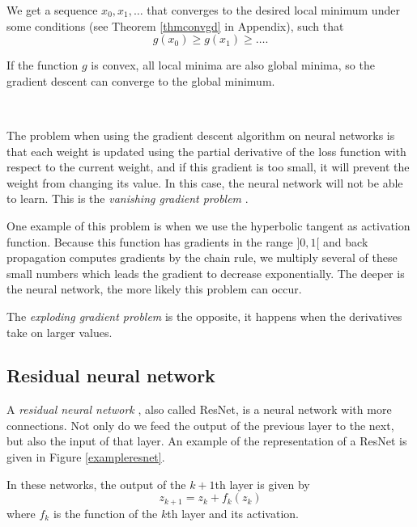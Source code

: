 \documentclass[10pt,a4paper]{article}
\theoremstyle{definition}
\theoremstyle{plain}
\begin{document}
We get a sequence $x_0,x_1,\dots$ that converges to the desired local minimum under some conditions (see Theorem \ref{thmconvgd} in Appendix), such that
$$
g(x_0) \geq g(x_1) \geq \dots . 
$$

If the function $g$ is convex, all local minima are also global minima, so the gradient descent can converge to the global minimum.

~

The problem when using the gradient descent algorithm on neural networks is that each weight is updated using the partial derivative of the loss function with respect to the current weight, and if this gradient is too small, it will prevent the weight from changing its value. In this case, the neural network will not be able to learn. This is the \textit{vanishing gradient problem} \cite{10}.

One example of this problem is when we use the hyperbolic tangent as activation function. Because this function has gradients in the range $]0,1[$ and back propagation computes gradients by the chain rule, we multiply several of these small numbers which leads the gradient to decrease exponentially. The deeper is the neural network, the more likely this problem can occur.

The \textit{exploding gradient problem} is the opposite, it happens when the derivatives take on larger values.


\subsection{Residual neural network} \label{rnn}

A\textit{ residual neural network} \cite{6}, also called ResNet, is a neural network with more connections. Not only do we feed the output of the previous layer to the next, but also the input of that layer. 
An example of the representation of a ResNet is given in Figure \ref{exampleresnet}.

In these networks, the output of the $k+1$th layer is given by
\begin{equation}\label{eqrn}
z_{k+1} = z_k + f_k(z_k)
\end{equation}
where $f_k$ is the function of the $k$th layer and its activation. 
\end{document}
